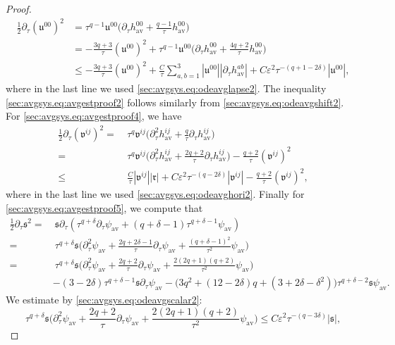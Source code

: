\documentclass[10pt,a4paper]{amsart}
\newcommand{\av}{\mathrm{av}}
\newcommand{\mf}{\mathfrak}
\newcommand{\pa}{\partial}
\newcommand{\ve}{\varepsilon}
\begin{document}
\begin{proof}
\begin{align}
        \frac{1}{2}\pa_\tau (\mf{u}^{00})^2 &= \tau^{q-1}\mf{u}^{00}\big(\pa_\tau h_{\av}^{00} + \frac{q-1}{\tau}h_{\av}^{00}\big)\nonumber\\
        &= - \frac{3q+3}{\tau}(\mf{u}^{00})^2 + \tau^{q-1}\mf{u}^{00}\big(\pa_\tau h_{\av}^{00} + \frac{4q+2}{\tau}h_{\av}^{00}\big)\nonumber\\
        &\leq -\frac{3q+3}{\tau}(\mf{u}^{00})^2 + \frac{C}{\tau}\sum_{a,b=1}^3|\mf{u}^{00}||\pa_\tau h_{\av}^{ab}| + C\ve^2\tau^{-(q+1-2\delta)}|\mf{u}^{00}|,
    \end{align}
    where in the last line we used \eqref{sec:avgsys.eq:odeavglapse2}. The inequality \eqref{sec:avgsys.eq:avgestproof2} follows similarly from \eqref{sec:avgsys.eq:odeavgshift2}. For \eqref{sec:avgsys.eq:avgestproof4}, we have
    \begin{align}
        \frac{1}{2}\pa_\tau (\mf{v}^{ij})^2 =&\>\tau^q\mf{v}^{ij}\big(\pa_\tau^2 h_{\av}^{ij} + \frac{q}{\tau}\pa_\tau h_{\av}^{ij}\big)\nonumber\\
        =&\>\tau^q\mf{v}^{ij}\big(\pa_\tau^2h_{\av}^{ij}+\frac{2q+2}{\tau}\pa_\tau h_{\av}^{ij}\big) - \frac{q+2}{\tau}(\mf{v}^{ij})^2\nonumber\\
        \leq&\> \frac{C}{\tau}|\mf{v}^{ij}||\mf{r}| + C\ve^2 \tau^{-(q-2\delta)}|\mf{v}^{ij}|- \frac{q+2}{\tau}(\mf{v}^{ij})^2,
    \end{align}
    where in the last line we used \eqref{sec:avgsys.eq:odeavghori2}. Finally for \eqref{sec:avgsys.eq:avgestproof5}, we compute that
    \begin{align}
        \frac{1}{2}\pa_\tau \mf{s}^2 = &\>\mf{s}\pa_\tau (\tau^{q+\delta} \pa_\tau \psi_{\av} + (q+\delta-1)\tau^{q+\delta-1}\psi_{\av})\nonumber\\
        =&\>\tau^{q+\delta} \mf{s}\Big(\pa_\tau^2\psi_{\av} + \frac{2q+2\delta-1}{\tau}\pa_\tau \psi_{\av} + \frac{(q+\delta-1)^2}{\tau^2}\psi_{\av}\Big)\nonumber\\
        =&\>\tau^{q+\delta}\mf{s}\Big(\pa_\tau^2\psi_{\av} + \frac{2q+2}{\tau}\pa_\tau \psi_{\av} + \frac{2(2q+1)(q+2)}{\tau^2}\psi_{\av}\Big)\nonumber\\
        &-(3-2\delta)\tau^{q+\delta-1}\mf{s}\pa_\tau \psi_{\av} - \big(3q^2+(12-2\delta)q+(3+2\delta-\delta^2)\big)\tau^{q+\delta-2}\mf{s}\psi_{\av}.
    \end{align}
    We estimate by \eqref{sec:avgsys.eq:odeavgscalar2}:
    \begin{equation}
        \tau^{q+\delta}\mf{s}\Big(\pa_\tau^2\psi_{\av} + \frac{2q+2}{\tau}\pa_\tau \psi_{\av} + \frac{2(2q+1)(q+2)}{\tau^2}\psi_{\av}\Big) \leq C\ve^2\tau^{-(q-3\delta)}|\mf{s}|,

\end{equation}
\end{proof}
\end{document}
